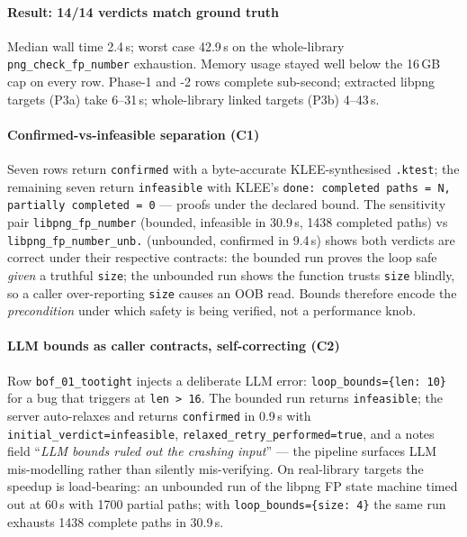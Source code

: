 \documentclass[3p,times,procedia]{elsarticle}
\begin{document}
\paragraph{Result: 14/14 verdicts match ground truth} Median wall time 2.4\,s; worst case 42.9\,s on the whole-library \texttt{png\_check\_fp\_number} exhaustion. Memory usage stayed well below the 16\,GB cap on every row. Phase-1 and -2 rows complete sub-second; extracted libpng targets (P3a) take 6--31\,s; whole-library linked targets (P3b) 4--43\,s.

\paragraph{Confirmed-vs-infeasible separation (C1)} Seven rows return \texttt{confirmed} with a byte-accurate KLEE-synthesised \texttt{.ktest}; the remaining seven return \texttt{infeasible} with KLEE's \texttt{done: completed paths = N, partially completed = 0} --- proofs under the declared bound. The sensitivity pair \texttt{libpng\_fp\_number} (bounded, infeasible in 30.9\,s, 1438 completed paths) vs \texttt{libpng\_fp\_number\_unb.} (unbounded, confirmed in 9.4\,s) shows both verdicts are correct under their respective contracts: the bounded run proves the loop safe \emph{given} a truthful \texttt{size}; the unbounded run shows the function trusts \texttt{size} blindly, so a caller over-reporting \texttt{size} causes an OOB read. Bounds therefore encode the \emph{precondition} under which safety is being verified, not a performance knob.

\paragraph{LLM bounds as caller contracts, self-correcting (C2)} Row \texttt{bof\_01\_tootight} injects a deliberate LLM error: \texttt{loop\_bounds=\{len: 10\}} for a bug that triggers at \texttt{len > 16}. The bounded run returns \texttt{infeasible}; the server auto-relaxes and returns \texttt{confirmed} in 0.9\,s with \texttt{initial\_verdict=infeasible}, \texttt{relaxed\_retry\_performed=true}, and a notes field ``\emph{LLM bounds ruled out the crashing input}'' --- the pipeline surfaces LLM mis-modelling rather than silently mis-verifying. On real-library targets the speedup is load-bearing: an unbounded run of the libpng FP state machine timed out at 60\,s with 1700 partial paths; with \texttt{loop\_bounds=\{size: 4\}} the same run exhausts 1438 complete paths in 30.9\,s.
\end{document}
